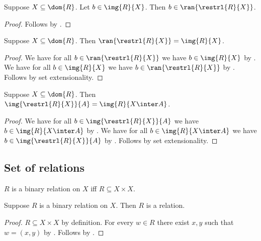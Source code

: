 \begin{proposition}\label{restrl_ran_intro}
    Suppose $X\subseteq\dom{R}$.
    Let $b\in\img{R}{X}$.
    Then $b\in\ran{\restrl{R}{X}}$.
\end{proposition}
\begin{proof}
    Follows by .
\end{proof}

\begin{proposition}\label{restrl_ran}
    Suppose $X\subseteq\dom{R}$.
    Then $\ran{\restrl{R}{X}} = \img{R}{X}$.
\end{proposition}
\begin{proof}
    We have for all $b\in\ran{\restrl{R}{X}}$ we have $b\in\img{R}{X}$
        by .
    We have for all $b\in\img{R}{X}$ we have $b\in\ran{\restrl{R}{X}}$
        by .
    Follows by set extensionality.
\end{proof}

\begin{proposition}\label{restrl_img}
    Suppose $X\subseteq\dom{R}$.
    Then $\img{\restrl{R}{X}}{A} = \img{R}{X\inter A}$.
\end{proposition}
\begin{proof}
    We have for all $b\in\img{\restrl{R}{X}}{A}$
        we have $b\in \img{R}{X\inter A}$
        by .
    We have for all $b\in\img{R}{X\inter A}$
        we have $b\in\img{\restrl{R}{X}}{A}$
        by .
    Follows by set extensionality.
\end{proof}



\subsection{Set of relations}

\begin{abbreviation}\label{binary_relation_on}
    $R$ is a binary relation on $X$ iff $R\subseteq X\times X$.
\end{abbreviation}

\begin{classification}\label{binary_relation_is_relation}
    Suppose $R$ is a binary relation on $X$.
    Then $R$ is a relation.
\end{classification}
\begin{proof}
    $R\subseteq X\times X$ by definition.
    For every $w\in R$ there exist $x,y$ such that $w=(x,y)$ by
        .
    Follows by .
\end{proof}

